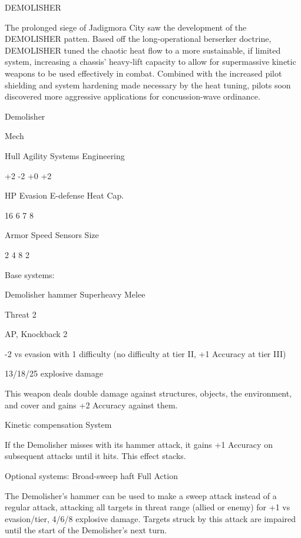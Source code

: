                                             DEMOLISHER  

The prolonged siege of Jadigmora City saw the development of the DEMOLISHER patten. Based  
off the long-operational berserker doctrine, DEMOLISHER tuned the chaotic heat flow to a more  
sustainable, if limited system, increasing a chassis’ heavy-lift capacity to allow for supermassive  
kinetic weapons to be used effectively in combat. Combined with the increased pilot shielding  
and system hardening made necessary by the heat tuning, pilots soon discovered more  
aggressive applications for concussion-wave ordinance. 
 

 Demolisher 

 Mech 

 Hull       Agility      Systems       Engineering 

 +2         -2           +0            +2 

 HP         Evasion      E-defense     Heat Cap. 

 16         6            7             8 

 Armor      Speed        Sensors       Size 

 2          4            8             2 

Base systems:
 
Demolisher hammer  
Superheavy Melee
 
Threat 2
 
AP, Knockback 2
 
-2 vs evasion with 1 difficulty (no difficulty at tier II, +1 Accuracy at tier III)
 
13/18/25 explosive damage
 
This weapon deals double damage against structures, objects, the environment, and cover and  
gains +2 Accuracy against them.
 

Kinetic compensation  
System
 
If the Demolisher misses with its hammer attack, it gains +1 Accuracy on subsequent attacks  
until it hits. This effect stacks.
 

Optional systems:  
Broad-sweep haft  
Full Action
 
The Demolisher’s hammer can be used to make a sweep attack instead of a regular attack,  
attacking all targets in threat range (allied or enemy) for +1 vs evasion/tier, 4/6/8 explosive  
damage. Targets struck by this attack are impaired until the start of the Demolisher’s next turn.
 

